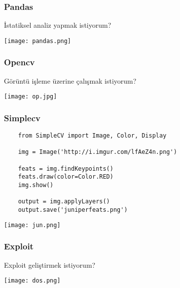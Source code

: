 \documentclass[10pt, compress]{beamer}
\begin{document}

\begin{frame}[fragile]
    \frametitle{Pandas}
    \begin{center}
        İstatiksel analiz yapmak istiyorum?
    \end{center}  
      \texttt{[image: pandas.png]}
\end{frame}


\begin{frame}[fragile]
    \frametitle{Opencv}
    \begin{center}
        Görüntü işleme üzerine çalışmak istiyorum?
    \end{center}  
      \texttt{[image: op.jpg]}
\end{frame}

\begin{frame}[fragile]
    \frametitle{Simplecv}
    \begin{center}
      \begin{verbatim}
    from SimpleCV import Image, Color, Display
    
    img = Image('http://i.imgur.com/lfAeZ4n.png')
    
    feats = img.findKeypoints()
    feats.draw(color=Color.RED)
    img.show()
    
    output = img.applyLayers()
    output.save('juniperfeats.png')
      \end{verbatim}
      \texttt{[image: jun.png]}
      \end{center}  
\end{frame}

\begin{frame}[fragile]
    \frametitle{Exploit}
    \begin{center}
        Exploit geliştirmek istiyorum?
    \end{center}  
      \texttt{[image: dos.png]}
\end{frame}
\end{document}
